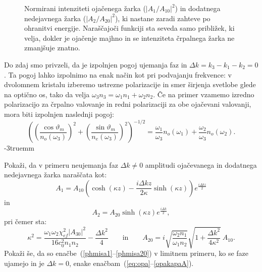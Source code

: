 \begin{figure}[ht]
\centering
\def\svgwidth{80truemm} 

\caption{Normirani intenziteti ojačenega žarka ($|A_1/A_{10}|^2$) in dodatnega 
nedejavnega žarka ($|A_2/A_{20}|^2$), ki nastane zaradi zahteve po ohranitvi energije. 
Naraščajoči funkciji sta seveda samo približek, ki velja, dokler je ojačenje majhno in 
se intenziteta črpalnega žarka ne zmanjšuje znatno.}
\label{fig:opagraf}
\end{figure}

Do zdaj smo privzeli, da je izpolnjen pogoj ujemanja faz 
in $\Delta k=k_{3}-k_{1}-k_{2}=0$. 
Ta pogoj lahko izpolnimo na enak način kot pri podvajanju frekvence: v dvolomnem kristalu 
izberemo ustrezne polarizacije in smer širjenja svetlobe glede na optično os, 
tako da velja $\omega_{3}n_{3}=\omega_{1}n_{1}+\omega_{2}n_{2}$.
Če na primer vzamemo izredno polarizacijo za črpalno valovanje
in redni polarizaciji za obe ojačevani valovanji, mora biti izpolnjen naslednji pogoj:
\begin{equation}
\left(\left(\frac{\cos\vartheta_{m}}{n_{o}(\omega_3)}\right)^{2}
+\left(\frac{\sin\vartheta_{m}}{n_{e}(\omega_3)}\right)^{2}\right)^{-1/2}=
\frac{\omega_{1}}{\omega_{3}}n_{o}(\omega_1)+\frac{\omega_{2}}{\omega_{3}}n_{o}(\omega_2).
\label{8.34}
\end{equation}
\vglue-3truemm
\begin{naloga}
Pokaži, da v primeru neujemanja faz $\Delta k \neq 0$ amplitudi ojačevanega in dodatnega 
nedejavnega žarka naraščata kot: 
\begin{equation}
A_1 = A_{10} \left( \cosh(\kappa z) - \frac{i \Delta kz}{2 \kappa} \sinh (\kappa z) 
\right) e^{\frac{i \Delta kz}{2}}
\label{phmisa1}
\end{equation}
in
\begin{equation}
A_2 = A_{20} \sinh(\kappa z) e^{\frac{i \Delta k}{2}},
\end{equation}
pri čemer sta:
\begin{equation}
\kappa^2 = \frac{\omega_1 \omega_2 \chi_{ef}^2|A_{30}|^2}
{16 c_0^2 n_1 n_2} - \frac{\Delta k^2}{4}
\qquad 
\mathrm{in}
\qquad
A_{20} = i \sqrt{\frac{\omega_2 n_1}{\omega_1 n_2}} \sqrt{1 + \frac{\Delta k^2}{4 \kappa^2}}
~A_{10}.
\label{phmisa20}
\end{equation}
Pokaži še, da so enačbe~(\ref{phmisa1}--\ref{phmisa20}) v limitnem primeru, 
ko se faze ujamejo in je $\Delta k = 0$,
enake enačbam~(\ref{eq:opa}--\ref{opakapaA}).
\end{naloga}


